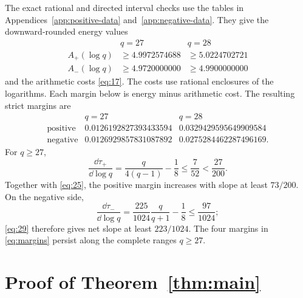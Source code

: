 The exact rational and directed interval checks use the tables in
Appendices~\ref{app:positive-data} and~\ref{app:negative-data}.
They give the downward-rounded energy values
\begin{equation}
\begin{array}{c|cc}
 &q=27&q=28\\ \hline
 A_+(\log q)&\ge4.9972574688&\ge5.0224702721\\
 A_-(\log q)&\ge4.9720000000&\ge4.9900000000
\end{array}                                                \label{eq:44}
\end{equation}
and the arithmetic costs \eqref{eq:17}. The costs use rational
enclosures of the logarithms. Each margin below
is energy minus arithmetic cost. The resulting strict margins are
\begin{equation}
\begin{array}{c|cc}
 &q=27&q=28\\ \hline
 \text{positive}&0.0126192827393433594&0.0329429595649909584\\
 \text{negative}&0.0126929857831087892&0.0275284462287496169 .
\end{array}                                                \label{eq:margins}
\end{equation}
For $q\ge27$,
\[
 \frac{\dd\tau_+}{\dd\log q}
 =\frac{q}{4(q-1)}-\frac18\le\frac7{52}<\frac{27}{200}.
\]
Together with \eqref{eq:25}, the positive margin increases with slope at
least $73/200$. On the negative side,
\[
 \frac{\dd\tau_-}{\dd\log q}
 =\frac{225}{1024}\frac q{q+1}-\frac18\le\frac{97}{1024};
\]
\eqref{eq:29} therefore gives net slope at least $223/1024$. The four margins in
\eqref{eq:margins} persist along the complete ranges $q\ge27$.

\section{Proof of Theorem~\ref{thm:main}}\label{sec:proof}

